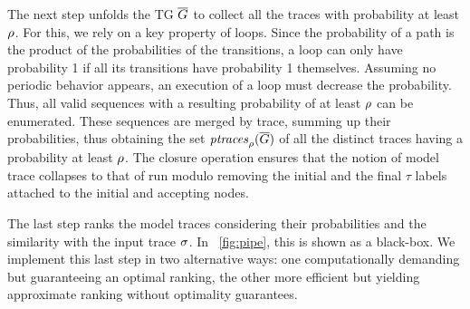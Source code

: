 The next step unfolds the TG $\overline{G}$ to collect all the traces with probability at least $\rho$. For this, we rely on a key
property of loops. Since the probability of a path is the product of the probabilities of the transitions, a loop can only have
probability 1 if all its transitions have probability 1 themselves. Assuming no periodic behavior appears, an execution of a
loop must decrease the probability. Thus, all valid sequences with a resulting probability of at least $\rho$ can be enumerated.
These sequences are merged by trace, summing up their probabilities, thus obtaining the set $\mathit{ptraces}_{\rho}(\overline{G})$
of all the distinct traces having a probability at least $\rho$. The closure operation ensures that the notion of model trace collapses to
that of run modulo removing the initial and the final $\tau$ labels attached to the initial and accepting nodes.

The last step ranks the model traces considering their probabilities and the similarity with the input trace $\sigma$. In
\figurename~\ref{fig:pipe}, this is shown as a black-box. We implement this last step in two alternative ways: one
computationally demanding but guaranteeing an optimal ranking, the other more efficient but yielding approximate ranking without
optimality guarantees.

\endinput


%
We can show that the TG obtained in Definition \ref{def:transf} preserves the same set of probabilistic traces associated by the reachability graph. The proof is omitted due to the lack of space.

\begin{example}
\figurename~\ref{fig:lmc} shows the TG obtained from the reachability graph in \figurename~\ref{fig:rg}. Nodes are labeled with the firing
transition labels (in green), and edges preserve the probabilistic information from the reachability graph (in red). Intuitively, when a
new initial node \textit{\textbf{i}} is inserted, we preserve all the initial probabilistic choices that a transition is fired from an initial
marking $M$, while the intermediate edges inherit the probabilistic choice of the firing transition from the subsequent choices. When
a new final node \textit{\textbf{f}} is added, such edges always have probability $1$, and thus do not interfere with the
initial traces' probability.
\end{example}

